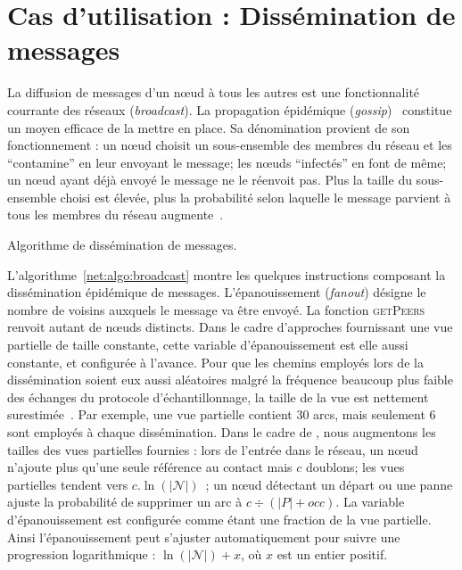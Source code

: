 
\section{Cas d'utilisation : Dissémination de messages}

La diffusion de messages d'un nœud à tous les autres est une fonctionnalité
courrante des réseaux (\emph{broadcast}). La propagation épidémique
(\emph{gossip})~\cite{birman1999bimodal} constitue un moyen efficace de la
mettre en place. Sa dénomination provient de son fonctionnement : un nœud
choisit un sous-ensemble des membres du réseau et les ``contamine'' en leur
envoyant le message; les nœuds ``infectés'' en font de même; un nœud ayant déjà
envoyé le message ne le réenvoit pas. Plus la taille du sous-ensemble choisi est
élevée, plus la probabilité selon laquelle le message parvient à tous les
membres du réseau
augmente~\cite{erdos1959random}. 

\begin{algorithm}
  
  \caption[Algorithme de dissémination de
  messages]{\label{net:algo:broadcast}Algorithme de dissémination de messages.}
\end{algorithm}


L'algorithme~\ref{net:algo:broadcast} montre les quelques instructions composant
la dissémination épidémique de messages. L'épanouissement (\emph{fanout})
désigne le nombre de voisins auxquels le message va être envoyé. La fonction
\textsc{getPeers} renvoit autant de nœuds distincts. Dans le cadre d'approches
fournissant une vue partielle de taille constante, cette variable
d'épanouissement est elle aussi constante, et configurée à l'avance. Pour que
les chemins employés lors de la dissémination soient eux aussi aléatoires malgré
la fréquence beaucoup plus faible des échanges du protocole d'échantillonnage,
la taille de la vue est nettement surestimée~\cite{frey2009heterogeneous}. Par
exemple, une vue partielle contient 30 arcs, mais seulement 6 sont employés à
chaque dissémination. Dans le cadre de \SPRAY, nous augmentons les tailles des
vues partielles fournies : lors de l'entrée dans le réseau, un nœud n'ajoute
plus qu'une seule référence au contact mais $c$ doublons; les vues partielles
tendent vers $c.\ln(|\mathcal{N}|)$~\cite{ganesh2003peer}; un nœud détectant un
départ ou une panne ajuste la probabilité de supprimer un arc à
$c \div (|P|+occ)$. La variable d'épanouissement est configurée comme étant une
fraction de la vue partielle. Ainsi l'épanouissement peut s'ajuster
automatiquement pour suivre une progression logarithmique :
$\ln(|\mathcal{N}|)+x$, où $x$ est un entier positif.

